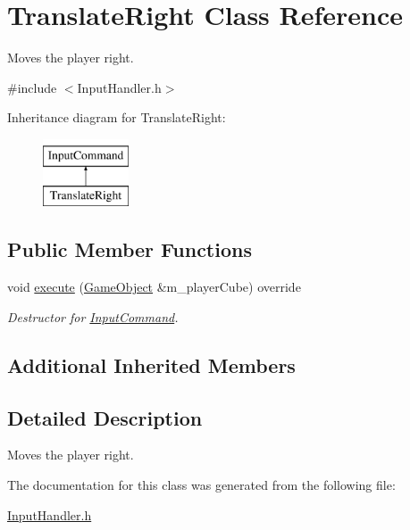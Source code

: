 \hypertarget{class_translate_right}{}\section{Translate\+Right Class Reference}
\label{class_translate_right}


Moves the player right.  




{\ttfamily \#include $<$Input\+Handler.\+h$>$}

Inheritance diagram for Translate\+Right\+:\begin{figure}[H]
\begin{center}
\leavevmode
\includegraphics[height=2.000000cm]{class_translate_right}
\end{center}
\end{figure}
\subsection*{Public Member Functions}
\begin{DoxyCompactItemize}
\item 
\mbox{\label{class_translate_right_af08246ff1a02a469e354f5c4182e5e98}} 
void \mbox{\hyperlink{class_translate_right_af08246ff1a02a469e354f5c4182e5e98}{execute}} (\mbox{\hyperlink{class_game_object}{Game\+Object}} \&m\+\_\+player\+Cube) override
\begin{DoxyCompactList}\small\item\em Destructor for \mbox{\hyperlink{class_input_command}{Input\+Command}}. \end{DoxyCompactList}\end{DoxyCompactItemize}
\subsection*{Additional Inherited Members}


\subsection{Detailed Description}
Moves the player right. 

The documentation for this class was generated from the following file\+:\begin{DoxyCompactItemize}
\item 
\mbox{\hyperlink{_input_handler_8h}{Input\+Handler.\+h}}\end{DoxyCompactItemize}
